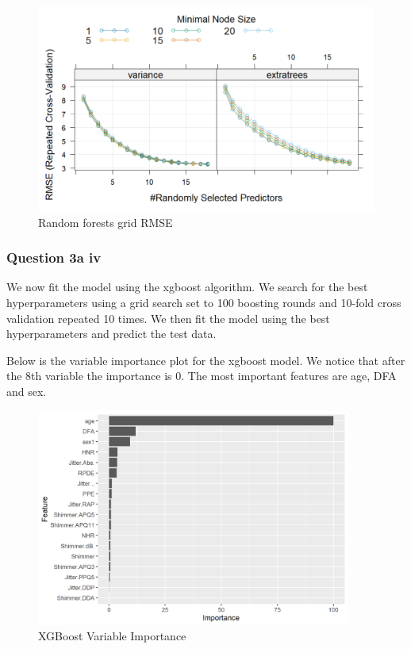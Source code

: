\documentclass[
]{article}
\begin{document}
\begin{figure}
\centering
\includegraphics[width=6.22917in,height=\textheight]{rmse_random_forest.png}
\caption{Random forests grid RMSE}
\end{figure}

\hypertarget{question-3a-iv}{%
\subsubsection{Question 3a iv}\label{question-3a-iv}}

We now fit the model using the xgboost algorithm. We search for the best
hyperparameters using a grid search set to 100 boosting rounds and
10-fold cross validation repeated 10 times. We then fit the model using
the best hyperparameters and predict the test data.

Below is the variable importance plot for the xgboost model. We notice
that after the 8th variable the importance is 0. The most important
features are age, DFA and sex.

\begin{figure}
\centering
\includegraphics[width=4.07292in,height=\textheight]{varimpo_xgboost.png}
\caption{XGBoost Variable Importance}
\end{figure}
\end{document}
